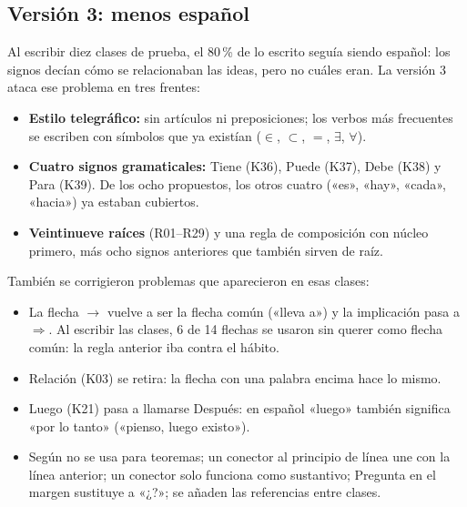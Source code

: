 \subsection{Versión 3: menos español}
Al escribir diez clases de prueba, el 80\,\% de lo escrito seguía siendo
español: los signos decían cómo se relacionaban las ideas, pero no cuáles eran.
La versión 3 ataca ese problema en tres frentes:
\begin{itemize}
\item \textbf{Estilo telegráfico:} sin artículos ni preposiciones; los verbos
 más frecuentes se escriben con símbolos que ya existían (\(\in\), \(\subset\),
 \(=\), \(\exists\), \(\forall\)).
\item \textbf{Cuatro signos gramaticales:} Tiene (K36), Puede (K37), Debe (K38)
 y Para (K39). De los ocho propuestos, los otros cuatro («es», «hay», «cada»,
 «hacia») ya estaban cubiertos.
\item \textbf{Veintinueve raíces} (R01--R29) y una regla de composición con
 núcleo primero, más ocho signos anteriores que también sirven de raíz.
\end{itemize}
También se corrigieron problemas que aparecieron en esas clases:
\begin{itemize}
\item La flecha \(\to\) vuelve a ser la flecha común («lleva a») y la
 implicación pasa a \(\Rightarrow\). Al escribir las clases, 6 de 14 flechas se
 usaron sin querer como flecha común: la regla anterior iba contra el hábito.
\item Relación (K03) se retira: la flecha con una palabra encima hace lo mismo.
\item Luego (K21) pasa a llamarse Después: en español «luego» también significa
 «por lo tanto» («pienso, luego existo»).
\item Según no se usa para teoremas; un conector al principio de línea une con
 la línea anterior; un conector solo funciona como sustantivo; Pregunta en el
 margen sustituye a «¿?»; se añaden las referencias entre clases.
\end{itemize}

